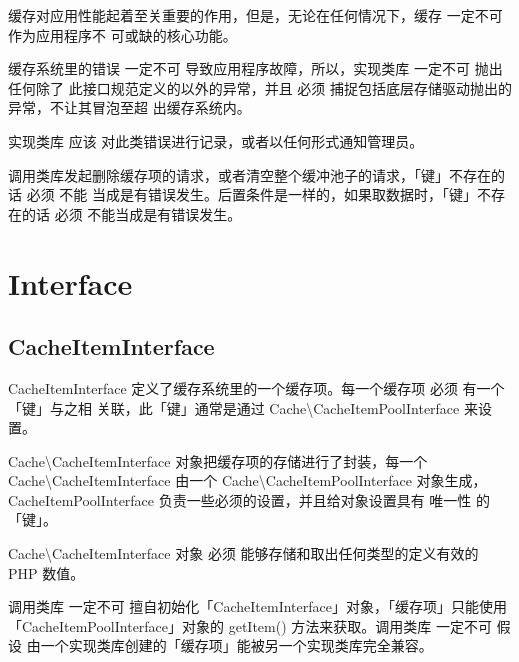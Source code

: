 缓存对应用性能起着至关重要的作用，但是，无论在任何情况下，缓存 一定不可 作为应用程序不 可或缺的核心功能。

缓存系统里的错误 一定不可 导致应用程序故障，所以，实现类库 一定不可 抛出任何除了 此接口规范定义的以外的异常，并且 必须 捕捉包括底层存储驱动抛出的异常，不让其冒泡至超 出缓存系统内。

实现类库 应该 对此类错误进行记录，或者以任何形式通知管理员。

调用类库发起删除缓存项的请求，或者清空整个缓冲池子的请求，「键」不存在的话 必须 不能 当成是有错误发生。后置条件是一样的，如果取数据时，「键」不存在的话 必须 不能当成是有错误发生。

\section{Interface}

\subsection{CacheItemInterface}


CacheItemInterface 定义了缓存系统里的一个缓存项。每一个缓存项 必须 有一个「键」与之相 关联，此「键」通常是通过 Cache\textbackslash CacheItemPoolInterface 来设置。

Cache\textbackslash CacheItemInterface 对象把缓存项的存储进行了封装，每一个 Cache\textbackslash CacheItemInterface 由一个 Cache\textbackslash CacheItemPoolInterface 对象生成，CacheItemPoolInterface 负责一些必须的设置，并且给对象设置具有 唯一性 的「键」。

Cache\textbackslash CacheItemInterface 对象 必须 能够存储和取出任何类型的定义有效的 PHP 数值。

调用类库 一定不可 擅自初始化「CacheItemInterface」对象，「缓存项」只能使用「CacheItemPoolInterface」对象的 getItem() 方法来获取。调用类库 一定不可 假设 由一个实现类库创建的「缓存项」能被另一个实现类库完全兼容。

